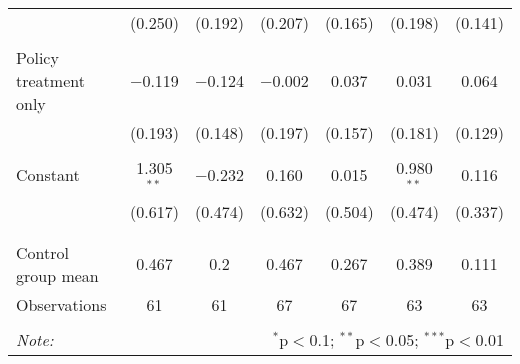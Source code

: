 \begin{tabular}{@{\extracolsep{5pt}}lcccccc}
  & (0.250) & (0.192) & (0.207) & (0.165) & (0.198) & (0.141) \\ 
  & & & & & & \\ 
 Policy treatment only & $-$0.119 & $-$0.124 & $-$0.002 & 0.037 & 0.031 & 0.064 \\ 
  & (0.193) & (0.148) & (0.197) & (0.157) & (0.181) & (0.129) \\ 
  & & & & & & \\ 
 Constant & 1.305$^{**}$ & $-$0.232 & 0.160 & 0.015 & 0.980$^{**}$ & 0.116 \\ 
  & (0.617) & (0.474) & (0.632) & (0.504) & (0.474) & (0.337) \\ 
  & & & & & & \\ 
\hline \\[-1.8ex] 
Control group mean & 0.467 & 0.2 & 0.467 & 0.267 & 0.389 & 0.111 \\ 
Observations & 61 & 61 & 67 & 67 & 63 & 63 \\ 
\hline 
\hline \\[-1.8ex] 
\textit{Note:}  & \multicolumn{6}{r}{$^{*}$p$<$0.1; $^{**}$p$<$0.05; $^{***}$p$<$0.01} \\ 
\end{tabular} 
